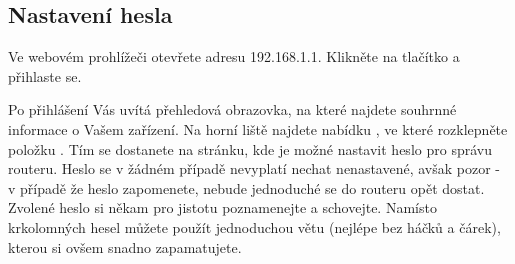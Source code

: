 \subsection{Nastavení hesla}
Ve webovém
prohlížeči otevřete adresu 192.168.1.1. Klikněte na tlačítko  a
přihlaste se.

Po přihlášení Vás uvítá přehledová obrazovka, na které najdete souhrnné informace
o Vašem zařízení. Na horní liště najdete nabídku , ve které rozklepněte
položku . Tím se dostanete na stránku, kde je možné nastavit
heslo pro správu routeru. Heslo se v žádném případě nevyplatí nechat nenastavené,
avšak pozor - v případě že heslo zapomenete, nebude jednoduché se do routeru
opět dostat. Zvolené heslo si někam pro jistotu poznamenejte a schovejte.
Namísto krkolomných hesel můžete použít jednoduchou větu (nejlépe bez háčků
a čárek), kterou si ovšem snadno zapamatujete.
